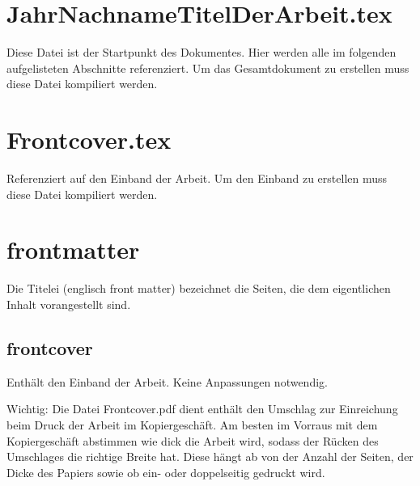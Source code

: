 
\section*{JahrNachnameTitelDerArbeit.tex}

Diese Datei ist der Startpunkt des Dokumentes. Hier werden alle im folgenden aufgelisteten Abschnitte referenziert. Um das Gesamtdokument zu erstellen muss diese Datei kompiliert werden.

\section*{Frontcover.tex}

Referenziert auf den Einband der Arbeit. Um den Einband zu erstellen muss diese Datei kompiliert werden.

\newpage

\section*{frontmatter}

Die Titelei (englisch front matter) bezeichnet die Seiten, die dem eigentlichen Inhalt vorangestellt sind.

\subsection*{frontcover}
\label{section:_01_frontcover}

Enthält den Einband der Arbeit. Keine Anpassungen notwendig.

Wichtig: Die Datei Frontcover.pdf dient enthält den Umschlag zur Einreichung beim Druck der Arbeit im Kopiergeschäft. Am besten im Vorraus mit dem Kopiergeschäft abstimmen wie dick die Arbeit wird, sodass der Rücken des Umschlages die richtige Breite hat. Diese hängt ab von der Anzahl der Seiten, der Dicke des Papiers sowie ob ein- oder doppelseitig gedruckt wird. 

